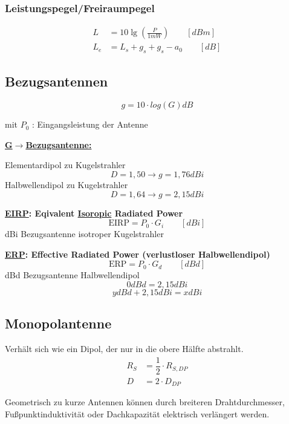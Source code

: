 \subsubsection{Leistungspegel/Freiraumpegel}
\begin{align*}
	L     & = 10 \lg \left(\frac{P}{1 \si{mW}}\right) \qquad [\si{dBm}] \\
	L_{e} & = L_{s}+g_{s}+g_{s}-a_{0} \qquad [\si{dB}]
\end{align*}

\subsection{Bezugsantennen}
\[
	\boxed{g = 10 \cdot log(G) \si{dB}}
\]

mit $P_0$ : Eingangsleistung der Antenne

\begin{description}
	\item \textbf{\underline{G$\rightarrow$Bezugsantenne:}}

	      Elementardipol  zu Kugelstrahler \[D = 1,50 \rightarrow g = 1,76\si{dBi}\]
	      Halbwellendipol zu Kugelstrahler \[D = 1,64 \rightarrow g = 2,15\si{dBi}\]

	\item \textbf{\underline{EIRP}: Eqivalent \underline{Isoropic} Radiated Power}
	      \[
		      \text{EIRP} = P_0 \cdot G_i \qquad [\si{dBi}]
	      \]
          \si{dBi} Bezugsantenne isotroper Kugelstrahler

	\item \textbf{\underline{ERP}: Effective Radiated Power (verlustloser Halbwellendipol)}
	      \[
		      \text{ERP} = P_0 \cdot G_d \qquad [\si{dBd}]
	      \]
          \si{dBd} Bezugsantenne Halbwellendipol
          \[
            0 \si{dBd} = 2,15 \si{dBi}
          \]
          \[
            y \si{dBd} + 2,15 \si{dBi} = x \si{dBi}
          \]
\end{description} 

\subsection{Monopolantenne}
Verhält sich wie ein Dipol, der nur in die obere Hälfte abstrahlt.
\begin{align*}
    R_S &= \dfrac{1}{2} \cdot R_{S,DP}\\
    D &= 2 \cdot D_{DP}
\end{align*}

Geometrisch zu kurze Antennen können durch breiteren Drahtdurchmesser,
Fußpunktinduktivität oder Dachkapazität elektrisch verlängert werden.